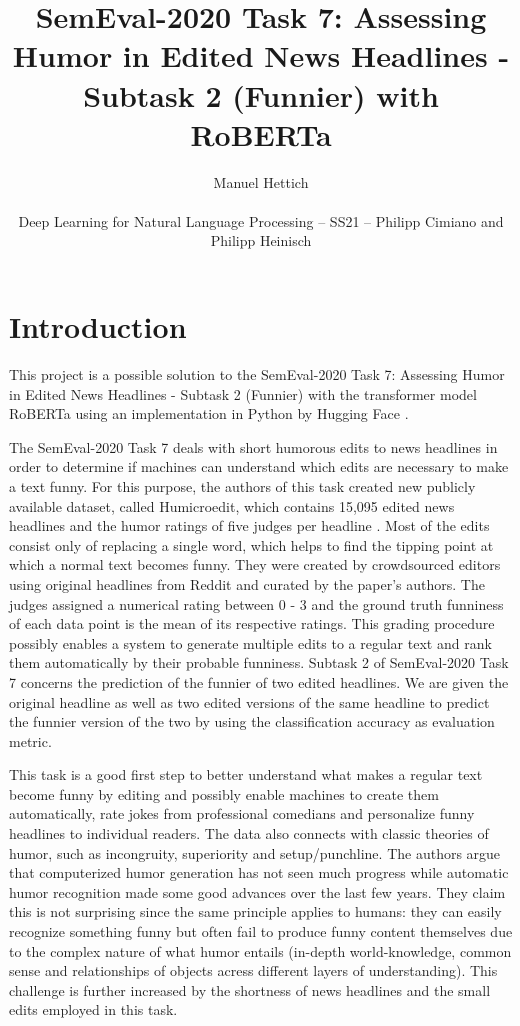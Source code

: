 \documentclass[11pt,a4paper,onecolumn,oneside,notitlepage]{article}
\author{Manuel Hettich\\

    \begin{small}
        Deep Learning for Natural Language Processing -- SS21 -- Philipp Cimiano and Philipp Heinisch
    \end{small}
}
\title{SemEval-2020 Task 7: Assessing Humor in Edited News Headlines - Subtask 2 (Funnier) with RoBERTa}
\begin{document}
    \maketitle


    \section{Introduction}
    This project is a possible solution to the SemEval-2020 Task 7: Assessing Humor in Edited News Headlines - Subtask 2 (Funnier) with the transformer model RoBERTa \citep{DBLP:journals/corr/abs-1907-11692} using an implementation in Python by Hugging Face \citep{wolf-etal-2020-transformers}.

    The SemEval-2020 Task 7 deals with short humorous edits to news headlines in order to determine if machines can understand which edits are necessary to make a text funny. For this purpose, the authors of this task created new publicly available dataset, called Humicroedit, which contains 15,095 edited news headlines and the humor ratings of five judges per headline \citep{hossain-etal-2019-president}. Most of the edits consist only of replacing a single word, which helps to find the tipping point at which a normal text becomes funny. They were created by crowdsourced editors using original headlines from Reddit and curated by the paper's authors. The judges assigned a numerical rating between 0 - 3 and the ground truth funniness of each data point is the mean of its respective ratings. This grading procedure possibly enables a system to generate multiple edits to a regular text and rank them automatically by their probable funniness. Subtask 2 of SemEval-2020 Task 7 concerns the prediction of the funnier of two edited headlines. We are given the original headline as well as two edited versions of the same headline to predict the funnier version of the two by using the classification accuracy as evaluation metric.

    This task is a good first step to better understand what makes a regular text become funny by editing and possibly enable machines to create them automatically, rate jokes from professional comedians and personalize funny headlines to individual readers. The data also connects with classic theories of humor, such as incongruity, superiority and setup/punchline. The authors argue that computerized humor generation has not seen much progress while automatic humor recognition made some good advances over the last few years. They claim this is not surprising since the same principle applies to humans: they can easily recognize something funny but often fail to produce funny content themselves due to the complex nature of what humor entails (in-depth world-knowledge, common sense and relationships of objects acress different layers of understanding). This challenge is further increased by the shortness of news headlines and the small edits employed in this task.
\end{document}
